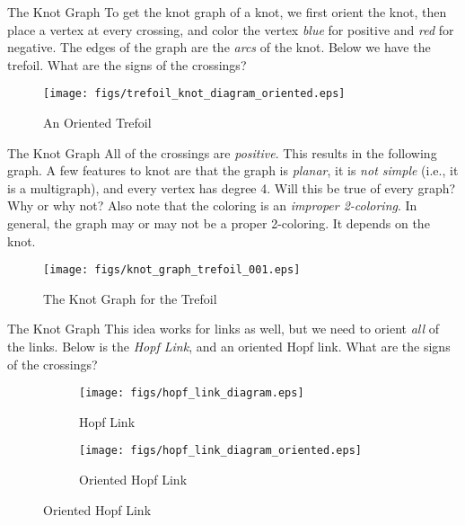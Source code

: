 \documentclass{beamer}
\begin{document}
    \begin{frame}{The Knot Graph}
        To get the knot graph of a knot, we first orient the knot, then
        place a vertex at every crossing, and color the vertex
        \textit{blue} for positive and \textit{red} for negative. The
        edges of the graph are the \textit{arcs} of the knot. Below we have
        the trefoil. What are the signs of the crossings?
        \begin{figure}
            \centering
            \texttt{[image: figs/trefoil\_knot\_diagram\_oriented.eps]}
            \caption{An Oriented Trefoil}
            \label{fig:oriented_trefoil}
        \end{figure}
    \end{frame}
    \begin{frame}{The Knot Graph}
        All of the crossings are \textit{positive}. This results in the following
        graph. A few features to knot are that the graph is \textit{planar},
        it is \textit{not simple} (i.e., it is a multigraph), and every vertex
        has degree 4. Will this be true of every graph? Why or why not?
        Also note that the coloring is an \textit{improper 2-coloring}. In general,
        the graph may or may not be a proper 2-coloring. It depends on the knot.
        \begin{figure}
            \centering
            \texttt{[image: figs/knot\_graph\_trefoil\_001.eps]}
            \caption{The Knot Graph for the Trefoil}
            \label{fig:knot_graph_trefoil}
        \end{figure}
    \end{frame}
    \begin{frame}{The Knot Graph}
        This idea works for links as well, but we need to orient \textit{all} of the links.
        Below is the \textit{Hopf Link}, and an oriented Hopf link. What are the signs of the crossings?
        \begin{figure}
            \centering
            \begin{subfigure}[b]{0.49\textwidth}
                \centering
                \texttt{[image: figs/hopf\_link\_diagram.eps]}
                \caption{Hopf Link}
                \label{fig:hopf_link}
            \end{subfigure}
            \begin{subfigure}[b]{0.49\textwidth}
                \centering
                \texttt{[image: figs/hopf\_link\_diagram\_oriented.eps]}
                \caption{Oriented Hopf Link}
                \label{fig:oriented_hopf_link}
            \end{subfigure}
        \end{figure}
    \end{frame}
\end{document}

